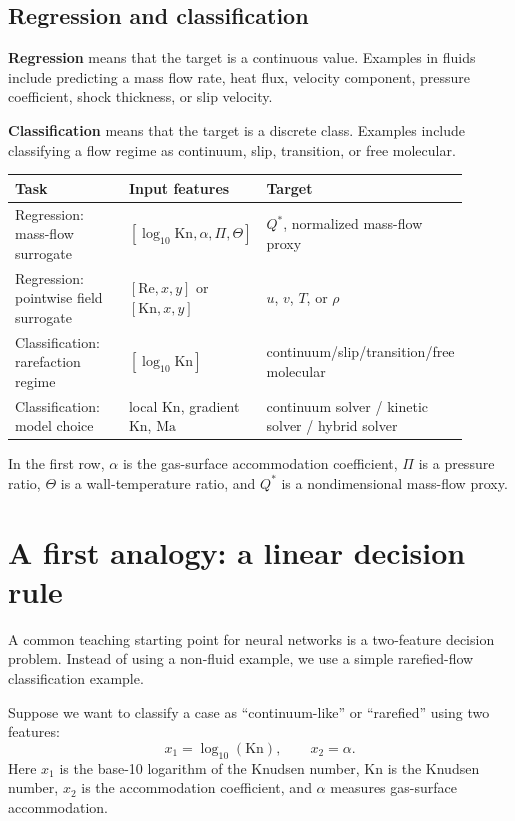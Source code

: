 \documentclass[11pt]{article}
\newcommand{\kn}{\mathrm{Kn}}
\newcommand{\re}{\mathrm{Re}}
\newcommand{\ma}{\mathrm{Ma}}
\begin{document}
\subsection{Regression and classification}

\textbf{Regression} means that the target is a continuous value.  Examples in fluids include predicting a mass flow rate, heat flux, velocity component, pressure coefficient, shock thickness, or slip velocity.

\textbf{Classification} means that the target is a discrete class.  Examples include classifying a flow regime as continuum, slip, transition, or free molecular.

\begin{center}
\begin{tabular}{p{0.30\linewidth}p{0.28\linewidth}p{0.32\linewidth}}
\toprule
Task & Input features & Target \\
\midrule
Regression: mass-flow surrogate & $\left[\log_{10}\kn,\alpha,\Pi,\Theta\right]$ & $Q^*$, normalized mass-flow proxy \\
Regression: pointwise field surrogate & $\left[\re,x,y\right]$ or $\left[\kn,x,y\right]$ & $u$, $v$, $T$, or $\rho$ \\
Classification: rarefaction regime & $\left[\log_{10}\kn\right]$ & continuum/slip/transition/free molecular \\
Classification: model choice & local $\kn$, gradient $\kn$, $\ma$ & continuum solver / kinetic solver / hybrid solver \\
\bottomrule
\end{tabular}
\end{center}

In the first row, $\alpha$ is the gas-surface accommodation coefficient, $\Pi$ is a pressure ratio, $\Theta$ is a wall-temperature ratio, and $Q^*$ is a nondimensional mass-flow proxy.

\section{A first analogy: a linear decision rule}

A common teaching starting point for neural networks is a two-feature decision problem.  Instead of using a non-fluid example, we use a simple rarefied-flow classification example.

Suppose we want to classify a case as ``continuum-like'' or ``rarefied'' using two features:
\begin{equation}
    x_1 = \log_{10}(\kn), \qquad x_2 = \alpha.
    \label{eq:two_features}
\end{equation}
Here $x_1$ is the base-10 logarithm of the Knudsen number, $\kn$ is the Knudsen number, $x_2$ is the accommodation coefficient, and $\alpha$ measures gas-surface accommodation.
\end{document}

